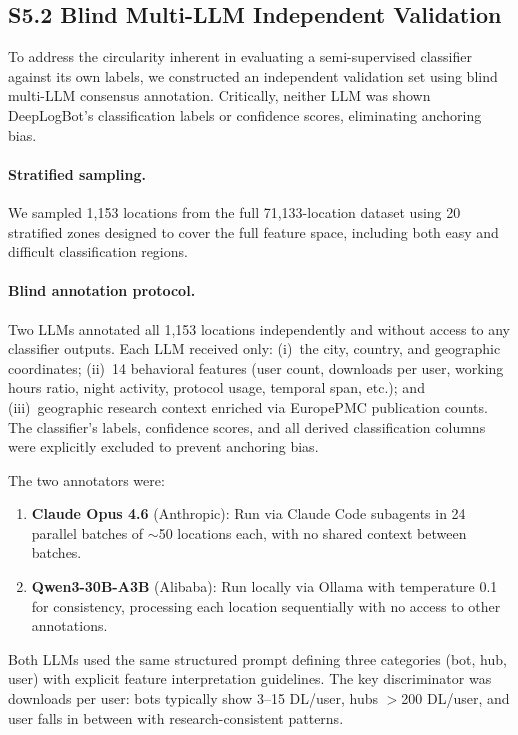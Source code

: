 \documentclass[11pt,a4paper]{article}
\begin{document}
\subsection{S5.2 Blind Multi-LLM Independent Validation}

To address the circularity inherent in evaluating a semi-supervised classifier against its own labels, we constructed an independent validation set using blind multi-LLM consensus annotation. Critically, neither LLM was shown DeepLogBot's classification labels or confidence scores, eliminating anchoring bias.

\paragraph{Stratified sampling.}
We sampled 1,153 locations from the full 71,133-location dataset using 20 stratified zones designed to cover the full feature space, including both easy and difficult classification regions.

\paragraph{Blind annotation protocol.}
Two LLMs annotated all 1,153 locations independently and without access to any classifier outputs. Each LLM received only: (i)~the city, country, and geographic coordinates; (ii)~14 behavioral features (user count, downloads per user, working hours ratio, night activity, protocol usage, temporal span, etc.); and (iii)~geographic research context enriched via EuropePMC publication counts. The classifier's labels, confidence scores, and all derived classification columns were explicitly excluded to prevent anchoring bias.

The two annotators were:
\begin{enumerate}
    \item \textbf{Claude Opus 4.6} (Anthropic): Run via Claude Code subagents in 24 parallel batches of $\sim$50 locations each, with no shared context between batches.
    \item \textbf{Qwen3-30B-A3B} (Alibaba): Run locally via Ollama with temperature 0.1 for consistency, processing each location sequentially with no access to other annotations.
\end{enumerate}

Both LLMs used the same structured prompt defining three categories (bot, hub, user) with explicit feature interpretation guidelines. The key discriminator was downloads per user: bots typically show 3--15 DL/user, hubs $>$200 DL/user, and user falls in between with research-consistent patterns.
\end{document}
